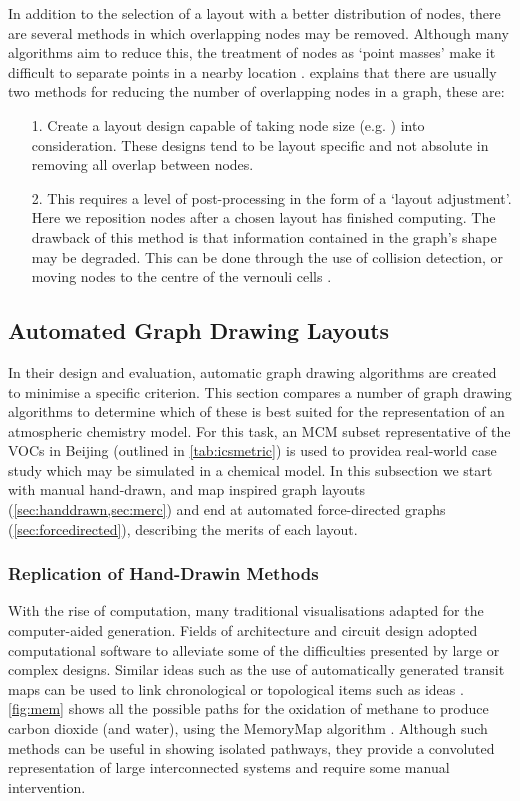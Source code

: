 In addition to the selection of a layout with a better distribution of nodes, there are several methods in which overlapping nodes may be removed. Although many algorithms aim to reduce this, the treatment of nodes as `point masses' make it difficult to separate points in a nearby location \citep{nodeoverlap}. \cite{IPSEPCOLA} explains that there are usually two methods for reducing the number of overlapping nodes in a graph, these are:


\begin{itemize}
\item [1.] Create a layout design capable of taking node size (e.g. \citep{nons}) into consideration. These designs tend to be layout specific and not absolute in removing all overlap between nodes. 
\item [2.] This requires a level of post-processing in the form of a `layout adjustment'. Here we reposition nodes after a chosen layout has finished computing. The drawback of this method is that information contained in the graph's shape may be degraded. This can be done through the use of collision detection, or moving nodes to the centre of the vernouli cells \citep{novern}. 
\end{itemize}




\subsection{Automated Graph Drawing Layouts}\label{sec:drawing}


In their design and evaluation, automatic graph drawing algorithms are created to minimise a specific criterion. This section compares a number of graph drawing algorithms to determine which of these is best suited for the representation of an atmospheric chemistry model. For this task, an MCM subset representative of the VOCs in Beijing (outlined in \autoref{tab:icsmetric}) is used to providea real-world case study which may be simulated in a chemical model. In this subsection we start with manual hand-drawn, and map inspired graph layouts (\autoref{sec:handdrawn,sec:merc}) and end at automated force-directed graphs (\autoref{sec:forcedirected}), describing the merits of each layout. 


\subsubsection{Replication of Hand-Drawin Methods}\label{sec:handdrawn}
With the rise of computation, many traditional visualisations adapted for the computer-aided generation. Fields of architecture and circuit design adopted computational software to alleviate some of the difficulties presented by large or complex designs. Similar ideas such as the use of automatically generated transit maps can be used to link chronological or topological items such as ideas \citep{memory}. \autoref{fig:mem} shows all the possible paths for the oxidation of methane to produce carbon dioxide (and water), using the MemoryMap algorithm \cite{memory}. Although such methods can be useful in showing isolated pathways, they provide a convoluted representation of large interconnected systems and require some manual intervention. 


